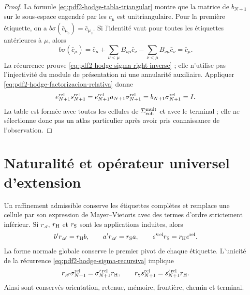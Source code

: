 \begin{proof}
La formule \eqref{eq:pdf2-hodge-tabla-triangular} montre que la
matrice de $b_{N+1}$ sur le sous-espace engendré par les $c_\mu$ est
unitriangulaire. Pour la première étiquette, on a
$b\sigma(\bar c_{\mu_0})=\bar c_{\mu_0}$. Si l'identité vaut pour toutes
les étiquettes antérieures à $\mu$, alors
\[
 b\sigma(\bar c_\mu)
 =\bar c_\mu+\sum_{\nu<\mu}B_{\nu\mu}\bar c_\nu
  -\sum_{\nu<\mu}B_{\nu\mu}\bar c_\nu
 =\bar c_\mu.
\]
La récurrence prouve \eqref{eq:pdf2-hodge-sigma-right-inverse} ; elle n'utilise pas
l'injectivité du module de présentation ni une annularité auxiliaire. Appliquer
\eqref{eq:pdf2-hodge-factorizacion-relativa} donne
\[
 e_{N+1}^{\rm rel}s_{N+1}^{\rm rel}
 =e_{N+1}^{\rm rel}a_{N+1}\sigma_{N+1}^{\rm rel}
 =b_{N+1}\sigma_{N+1}^{\rm rel}=I.
\]
La table est formée avec toutes les cellules de
$\Sigma_{\rm coh}^{\rm mult}$ et avec le terminal ; elle ne sélectionne donc pas un
atlas particulier après avoir pris connaissance de l'observation.
\end{proof}

\section{Naturalité et opérateur universel d'extension}

Un raffinement admissible conserve les étiquettes complètes et remplace une
cellule par son expression de Mayer--Vietoris avec des termes d'ordre strictement
inférieur. Si $r_{\mathscr A}$, $r_{\rm H}$ et $r_{\rm S}$ sont les applications
induites, alors
\begin{equation}\label{eq:pdf2-hodge-entrelazadores-refinamiento}
 b' r_{\mathscr A}=r_{\rm H}b,
 \qquad
 a' r_{\mathscr A}=r_{\rm S}a,
 \qquad
 e'^{\rm rel}r_{\rm S}=r_{\rm H}e^{\rm rel}.
\end{equation}
La forme normale globale conserve le premier pivot de chaque étiquette.
L'unicité de la récurrence \eqref{eq:pdf2-hodge-sigma-recursiva} implique
\begin{equation}\label{eq:pdf2-hodge-naturalidad}
 r_{\mathscr A}\sigma_{N+1}^{\rm rel}
 =\sigma_{N+1}^{\prime\,\rm rel}r_{\rm H},
 \qquad
 r_{\rm S}s_{N+1}^{\rm rel}
 =s_{N+1}^{\prime\,\rm rel}r_{\rm H}.
\end{equation}
Ainsi sont conservés orientation, retenue, mémoire, frontière, chemin et terminal.

